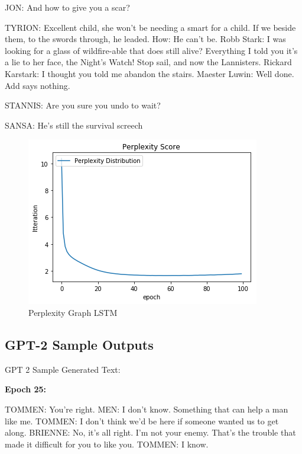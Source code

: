\documentclass[11pt,a4paper]{article}
\begin{document}
JON: And how to give you a scar?

TYRION: Excellent child, she won't be needing a smart for a child. If we beside them, to the swords through, he leaded. How: He can't be.
Robb Stark: I was looking for a glass of wildfire-able that does still alive? Everything I told you it's a lie to her face, the Night's Watch! Stop sail, and now the Lannisters.
Rickard Karstark: I thought you told me abandon the stairs.
Maester Luwin: Well done.
Add says nothing.

STANNIS: Are you sure you undo to wait?

SANSA: He's still the survival screech

\begin{figure}[h]
\includegraphics[width=1.0\linewidth]{LSTMPerp.png}
\caption{Perplexity Graph LSTM}
\end{figure}


\subsection{GPT-2 Sample Outputs}

GPT 2 Sample Generated Text:\newline 

\textbf{Epoch 25:}\newline 

TOMMEN: You're right.\newline  
MEN: I don't know. Something that can help a man like me.\newline 
TOMMEN: I don't think we'd be here if someone wanted us to get along.\newline 
BRIENNE: No, it's all right. I'm not your enemy. That's the trouble that made it difficult for you to like you.\newline  
TOMMEN: I know.\newline 
\end{document}
